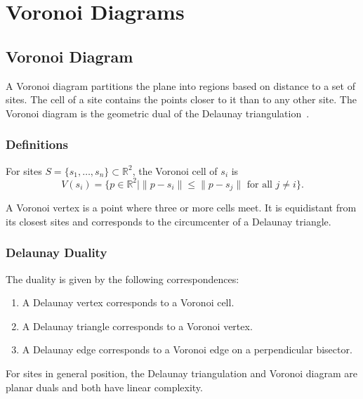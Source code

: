 \chapter{Voronoi Diagrams}
\label{ch:voronoi_diagrams}

\section{Voronoi Diagram}
\label{sec:voronoi_diagram}

A Voronoi diagram partitions the plane into regions
based on distance to a set of sites. The cell of a site contains the points
closer to it than to any other site. The Voronoi diagram is the geometric dual
of the Delaunay triangulation~\cite{voronoi1908,aurenhammer1991}.

\subsection{Definitions}

\begin{definition}\label{def:voronoi_cell}
For sites $S = \{s_1,\ldots,s_n\} \subset \mathbb{R}^2$, the Voronoi cell of $s_i$
is
\[
V(s_i) = \{p \in \mathbb{R}^2 \mid \|p-s_i\| \leq \|p-s_j\|\text{ for all }j\ne i\}.
\]
\end{definition}

\begin{definition}\label{def:voronoi_vertex}
A Voronoi vertex is a point where three or more cells meet. It is equidistant
from its closest sites and corresponds to the circumcenter of a Delaunay
triangle.
\end{definition}

\subsection{Delaunay Duality}

The duality is given by the following correspondences:
\begin{enumerate}
\item A Delaunay vertex corresponds to a Voronoi cell.
\item A Delaunay triangle corresponds to a Voronoi vertex.
\item A Delaunay edge corresponds to a Voronoi edge on a perpendicular bisector.
\end{enumerate}

\begin{theorem}\label{thm:dt_vd_duality}
For sites in general position, the Delaunay triangulation and Voronoi diagram
are planar duals and both have linear complexity.
\end{theorem}

